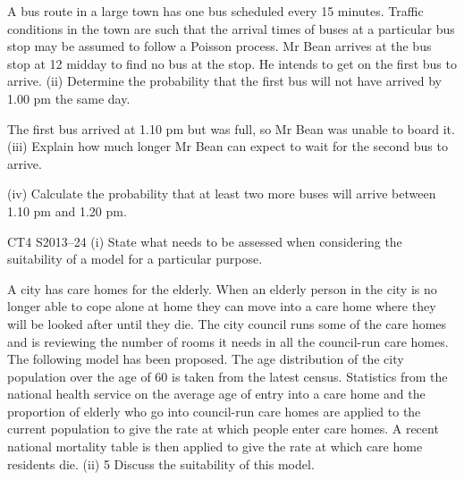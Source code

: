 A bus route in a large town has one bus scheduled every 15 minutes. Traffic
conditions in the town are such that the arrival times of buses at a particular bus stop
may be assumed to follow a Poisson process.
Mr Bean arrives at the bus stop at 12 midday to find no bus at the stop. He intends to
get on the first bus to arrive.
(ii)
Determine the probability that the first bus will not have arrived by 1.00 pm
the same day.

The first bus arrived at 1.10 pm but was full, so Mr Bean was unable to board it.
(iii) Explain how much longer Mr Bean can expect to wait for the second bus to
arrive.

(iv) Calculate the probability that at least two more buses will arrive between
1.10 pm and 1.20 pm.

CT4 S2013–24
(i)
State what needs to be assessed when considering the suitability of a model for
a particular purpose.

A city has care homes for the elderly. When an elderly person in the city is no longer
able to cope alone at home they can move into a care home where they will be looked
after until they die.
The city council runs some of the care homes and is reviewing the number of rooms it
needs in all the council-run care homes. The following model has been proposed.
The age distribution of the city population over the age of 60 is taken from the latest
census. Statistics from the national health service on the average age of entry into a
care home and the proportion of elderly who go into council-run care homes are
applied to the current population to give the rate at which people enter care homes. A
recent national mortality table is then applied to give the rate at which care home
residents die.
(ii)
5
Discuss the suitability of this model.

